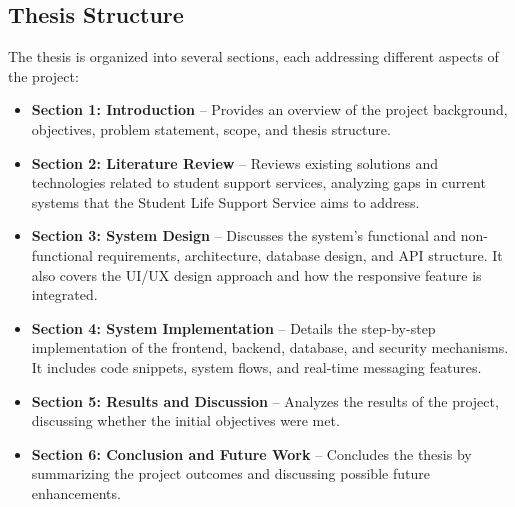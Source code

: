\subsection{Thesis Structure}
The thesis is organized into several sections, each addressing different aspects of the project:
	\begin{itemize}
		\item \textbf{Section 1: Introduction} – Provides an overview of the project background, objectives, problem statement, scope, and thesis structure.
		
		\item \textbf{Section 2: Literature Review} – Reviews existing solutions and technologies related to student support services, analyzing gaps in current systems that the Student Life Support Service aims to address.
		
		\item \textbf{Section 3: System Design} – Discusses the system's functional and non-functional requirements, architecture, database design, and API structure. It also covers the UI/UX design approach and how the responsive feature is integrated.
		
		\item \textbf{Section 4: System Implementation} – Details the step-by-step implementation of the frontend, backend, database, and security mechanisms. It includes code snippets, system flows, and real-time messaging features.
		
		
		\item \textbf{Section 5: Results and Discussion} – Analyzes the results of the project, discussing whether the initial objectives were met.
		
		\item \textbf{Section 6: Conclusion and Future Work} – Concludes the thesis by summarizing the project outcomes and discussing possible future enhancements.
	\end{itemize}

